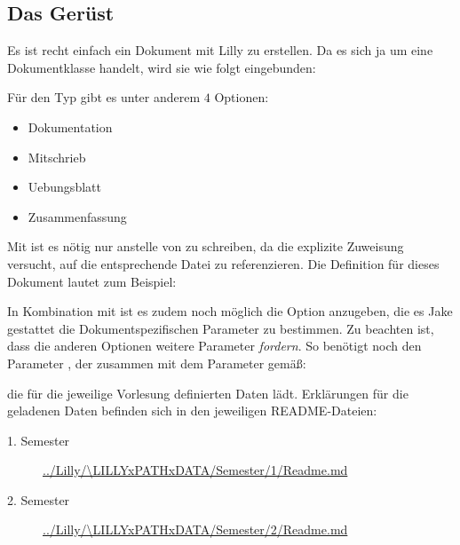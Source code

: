 \subsection{Das Gerüst}
Es ist recht einfach ein Dokument mit Lilly zu erstellen. Da es sich ja um eine Dokumentklasse handelt, wird sie wie folgt eingebunden:
Für den Typ gibt es unter anderem $4$ Optionen:
\begin{multicols}{2}
    \begin{itemize}[label=$\diamond$]\narrowitems
        \item Dokumentation
        \item Mitschrieb
        \item Uebungsblatt
        \item Zusammenfassung
    \end{itemize}
\end{multicols}
Mit  ist es nötig nur  anstelle von  zu schreiben, da die explizite Zuweisung versucht, auf die entsprechende Datei zu referenzieren. Die Definition für dieses Dokument lautet zum Beispiel: %
In Kombination mit \Jake ist es zudem noch möglich die Option  anzugeben, die es Jake gestattet die Dokumentspezifischen Parameter zu bestimmen.\newline
Zu beachten ist, dass die anderen Optionen weitere Parameter \emph{fordern}. \newline
So benötigt  noch den Parameter , der zusammen mit dem Parameter  gemäß:
\begin{latex}

\end{latex}
die für die jeweilige Vorlesung definierten Daten lädt.
Erklärungen für die geladenen Daten befinden sich in den jeweiligen README-Dateien:
\begin{description}
    \item[1. Semester] \url{../Lilly/\LILLYxPATHxDATA/Semester/1/Readme.md}
    \item[2. Semester] \url{../Lilly/\LILLYxPATHxDATA/Semester/2/Readme.md}
\end{description}


